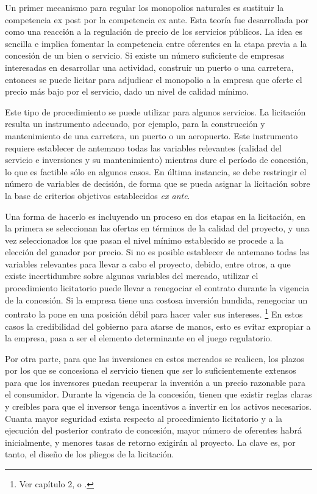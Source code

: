 \documentclass[
  12pt,
  spanish,
]{book}
\begin{document}
Un primer mecanismo para regular los monopolios naturales es sustituir la competencia ex post por la competencia ex ante. Esta teoría fue desarrollada por \citet{Demsetz1968} como una reacción a la regulación de precio de los servicios públicos. La idea es sencilla e implica fomentar la competencia entre oferentes en la etapa previa a la concesión de un bien o servicio. Si existe un número suficiente de empresas interesadas en desarrollar una actividad, construir un puerto o una carretera, entonces se puede licitar para adjudicar el monopolio a la empresa que oferte el precio más bajo por el servicio, dado un nivel de calidad mínimo.

Este tipo de procedimiento se puede utilizar para algunos servicios. La licitación resulta un instrumento adecuado, por ejemplo, para la construcción y mantenimiento de una carretera, un puerto o un aeropuerto. Este instrumento requiere establecer de antemano todas las variables relevantes (calidad del servicio e inversiones y su mantenimiento) mientras dure el período de concesión, lo que es factible sólo en algunos casos. En última instancia, se debe restringir el número de variables de decisión, de forma que se pueda asignar la licitación sobre la base de criterios objetivos establecidos \emph{ex ante}.

Una forma de hacerlo es incluyendo un proceso en dos etapas en la licitación, en la primera se seleccionan las ofertas en términos de la calidad del proyecto, y una vez seleccionados los que pasan el nivel mínimo establecido se procede a la elección del ganador por precio. Si no es posible establecer de antemano todas las variables relevantes para llevar a cabo el proyecto, debido, entre otros, a que existe incertidumbre sobre algunas variables del mercado, utilizar el procedimiento licitatorio puede llevar a renegociar el contrato durante la vigencia de la concesión. Si la empresa tiene una costosa inversión hundida, renegociar un contrato la pone en una posición débil para hacer valer sus intereses.
\footnote{Ver \citet{Bergara2003} capítulo 2, o \citet{Williamson1998}.}
En estos casos la credibilidad del gobierno para atarse de manos, esto es evitar expropiar a la empresa, pasa a ser el elemento determinante en el juego regulatorio.

Por otra parte, para que las inversiones en estos mercados se realicen, los plazos por los que se concesiona el servicio tienen que ser lo suficientemente extensos para que los inversores puedan recuperar la inversión a un precio razonable para el consumidor. Durante la vigencia de la concesión, tienen que existir reglas claras y creíbles para que el inversor tenga incentivos a invertir en los activos necesarios. Cuanta mayor seguridad exista respecto al procedimiento licitatorio y a la ejecución del posterior contrato de concesión, mayor número de oferentes habrá inicialmente, y menores tasas de retorno exigirán al proyecto. La clave es, por tanto, el diseño de los pliegos de la licitación.
\end{document}

